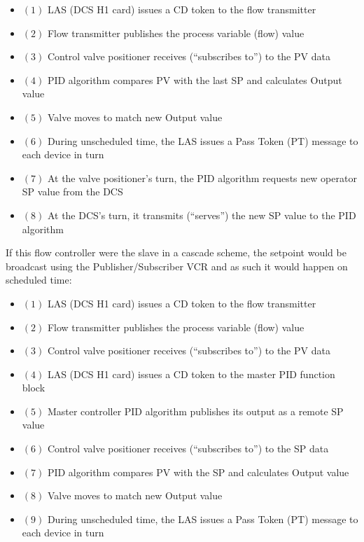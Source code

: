 





\begin{itemize}
\item{$(1)$} LAS (DCS H1 card) issues a CD token to the flow transmitter
\item{$(2)$} Flow transmitter publishes the process variable (flow) value
\item{$(3)$} Control valve positioner receives (``subscribes to'') to the PV data
\item{$(4)$} PID algorithm compares PV with the last SP and calculates Output value
\item{$(5)$} Valve moves to match new Output value
\item{$(6)$} During unscheduled time, the LAS issues a Pass Token (PT) message to each device in turn
\item{$(7)$} At the valve positioner's turn, the PID algorithm requests new operator SP value from the DCS 
\item{$(8)$} At the DCS's turn, it transmits (``serves'') the new SP value to the PID algorithm
\end{itemize}







If this flow controller were the slave in a cascade scheme, the setpoint would be broadcast using the Publisher/Subscriber VCR and as such it would happen on scheduled time:

\begin{itemize}
\item{$(1)$} LAS (DCS H1 card) issues a CD token to the flow transmitter
\item{$(2)$} Flow transmitter publishes the process variable (flow) value
\item{$(3)$} Control valve positioner receives (``subscribes to'') to the PV data
\item{$(4)$} LAS (DCS H1 card) issues a CD token to the master PID function block
\item{$(5)$} Master controller PID algorithm publishes its output as a remote SP value
\item{$(6)$} Control valve positioner receives (``subscribes to'') to the SP data
\item{$(7)$} PID algorithm compares PV with the SP and calculates Output value
\item{$(8)$} Valve moves to match new Output value
\item{$(9)$} During unscheduled time, the LAS issues a Pass Token (PT) message to each device in turn
\end{itemize}




